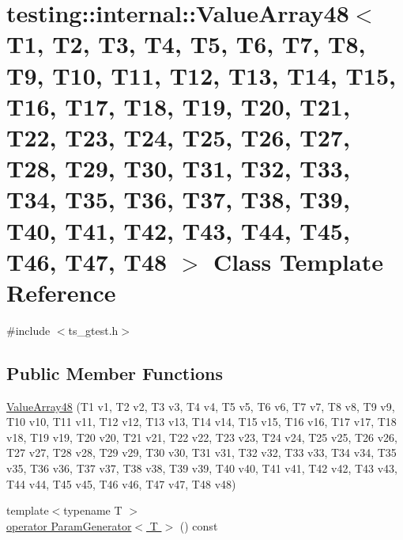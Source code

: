 \hypertarget{classtesting_1_1internal_1_1ValueArray48}{\section{testing\-:\-:internal\-:\-:Value\-Array48$<$ T1, T2, T3, T4, T5, T6, T7, T8, T9, T10, T11, T12, T13, T14, T15, T16, T17, T18, T19, T20, T21, T22, T23, T24, T25, T26, T27, T28, T29, T30, T31, T32, T33, T34, T35, T36, T37, T38, T39, T40, T41, T42, T43, T44, T45, T46, T47, T48 $>$ Class Template Reference}
\label{classtesting_1_1internal_1_1ValueArray48}
}


{\ttfamily \#include $<$ts\-\_\-gtest.\-h$>$}

\subsection*{Public Member Functions}
\begin{DoxyCompactItemize}
\item 
\hyperlink{classtesting_1_1internal_1_1ValueArray48_ae49d04f88d7001564bdfe679b469b390}{Value\-Array48} (T1 v1, T2 v2, T3 v3, T4 v4, T5 v5, T6 v6, T7 v7, T8 v8, T9 v9, T10 v10, T11 v11, T12 v12, T13 v13, T14 v14, T15 v15, T16 v16, T17 v17, T18 v18, T19 v19, T20 v20, T21 v21, T22 v22, T23 v23, T24 v24, T25 v25, T26 v26, T27 v27, T28 v28, T29 v29, T30 v30, T31 v31, T32 v32, T33 v33, T34 v34, T35 v35, T36 v36, T37 v37, T38 v38, T39 v39, T40 v40, T41 v41, T42 v42, T43 v43, T44 v44, T45 v45, T46 v46, T47 v47, T48 v48)
\item 
{\footnotesize template$<$typename T $>$ }\\\hyperlink{classtesting_1_1internal_1_1ValueArray48_a7879adf2ded46ba3fac84700bf539136}{operator Param\-Generator$<$ T $>$} () const 
\end{DoxyCompactItemize}


